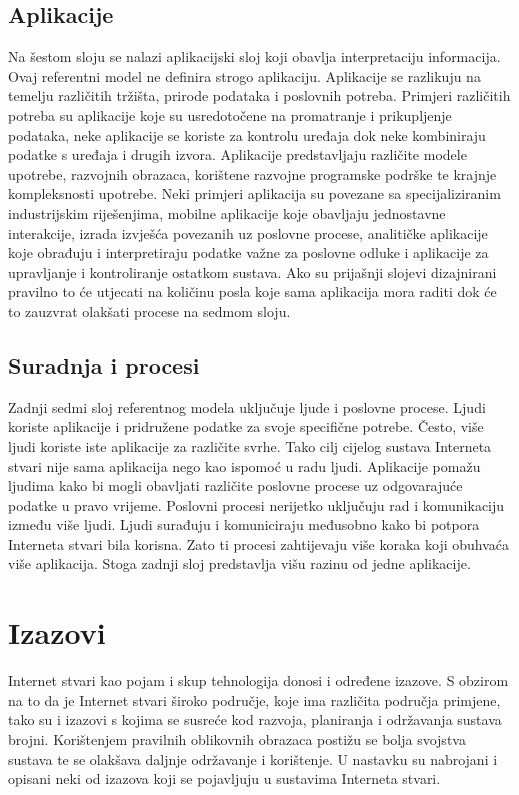 \documentclass[times, utf8, diplomski]{fer}
\begin{document}
\subsection{Aplikacije}
Na šestom sloju se nalazi aplikacijski sloj koji obavlja interpretaciju informacija. Ovaj referentni model ne definira strogo aplikaciju. Aplikacije se razlikuju na temelju različitih tržišta, prirode podataka i poslovnih potreba. Primjeri različitih potreba su aplikacije koje su usredotočene na promatranje i prikupljenje podataka, neke aplikacije se koriste za kontrolu uređaja dok neke kombiniraju podatke s uređaja i drugih izvora. Aplikacije predstavljaju različite modele upotrebe, razvojnih obrazaca, korištene razvojne programske podrške te krajnje kompleksnosti upotrebe. Neki primjeri aplikacija su povezane sa specijaliziranim industrijskim riješenjima, mobilne aplikacije koje obavljaju jednostavne interakcije, izrada izvješća povezanih uz poslovne procese, analitičke aplikacije koje obrađuju i interpretiraju podatke važne za poslovne odluke i aplikacije za upravljanje i kontroliranje ostatkom sustava. Ako su prijašnji slojevi dizajnirani pravilno to će utjecati na količinu posla koje sama aplikacija mora raditi dok će to zauzvrat olakšati procese na sedmom sloju. 

\subsection{Suradnja i procesi}
Zadnji sedmi sloj referentnog modela uključuje ljude i poslovne procese. Ljudi koriste aplikacije i pridružene podatke za svoje specifične potrebe. Često, više ljudi koriste iste aplikacije za različite svrhe. Tako cilj cijelog sustava Interneta stvari nije sama aplikacija nego kao ispomoć u radu ljudi. Aplikacije pomažu ljudima kako bi mogli obavljati različite poslovne procese uz odgovarajuće podatke u pravo vrijeme. Poslovni procesi nerijetko uključuju rad i komunikaciju između više ljudi. Ljudi surađuju i komuniciraju međusobno kako bi potpora Interneta stvari bila korisna. Zato ti procesi zahtijevaju više koraka koji obuhvaća više aplikacija. Stoga zadnji sloj predstavlja višu razinu od jedne aplikacije.

\section{Izazovi}
Internet stvari kao pojam i skup tehnologija donosi i određene izazove. S obzirom na to da je Internet stvari široko područje, koje ima različita područja primjene, tako su i izazovi s kojima se susreće kod razvoja, planiranja i održavanja sustava brojni. Korištenjem pravilnih oblikovnih obrazaca postižu se bolja svojstva sustava te se olakšava daljnje održavanje i korištenje. U nastavku su nabrojani i opisani neki od izazova koji se pojavljuju u sustavima Interneta stvari.
\end{document}
